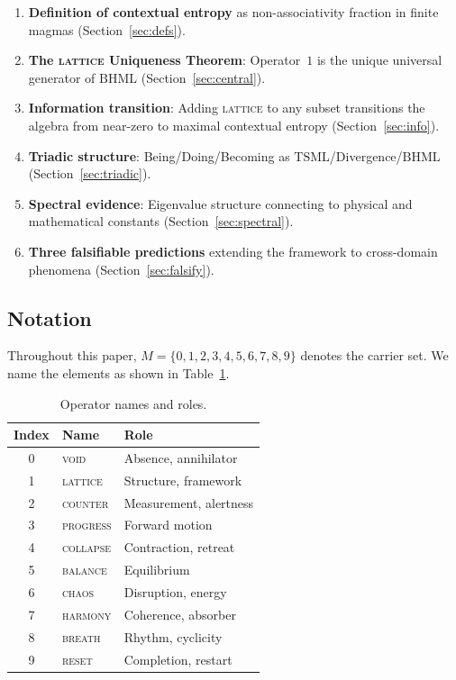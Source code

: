 \documentclass[11pt,a4paper]{article}
\theoremstyle{definition}
\theoremstyle{remark}
\newcommand{\TSML}{\mathrm{TSML}}
\newcommand{\BHML}{\mathrm{BHML}}
\begin{document}
\begin{enumerate}[label=(\arabic*)]
\item \textbf{Definition of contextual entropy} as non-associativity fraction in finite magmas (Section~\ref{sec:defs}).
\item \textbf{The \textsc{lattice} Uniqueness Theorem}: Operator~$1$ is the unique universal generator of $\BHML$ (Section~\ref{sec:central}).
\item \textbf{Information transition}: Adding \textsc{lattice} to any subset transitions the algebra from near-zero to maximal contextual entropy (Section~\ref{sec:info}).
\item \textbf{Triadic structure}: Being/Doing/Becoming as $\TSML$/Divergence/$\BHML$ (Section~\ref{sec:triadic}).
\item \textbf{Spectral evidence}: Eigenvalue structure connecting to physical and mathematical constants (Section~\ref{sec:spectral}).
\item \textbf{Three falsifiable predictions} extending the framework to cross-domain phenomena (Section~\ref{sec:falsify}).
\end{enumerate}

\subsection{Notation}\label{sec:notation}

Throughout this paper, $M = \{0,1,2,3,4,5,6,7,8,9\}$ denotes the carrier set. We name the elements as shown in Table~\ref{tab:operators}.

\begin{table}[ht]
\centering
\caption{Operator names and roles.}\label{tab:operators}
\begin{tabular}{cll}
\toprule
Index & Name & Role \\
\midrule
0 & \textsc{void}     & Absence, annihilator \\
1 & \textsc{lattice}  & Structure, framework \\
2 & \textsc{counter}  & Measurement, alertness \\
3 & \textsc{progress} & Forward motion \\
4 & \textsc{collapse} & Contraction, retreat \\
5 & \textsc{balance}  & Equilibrium \\
6 & \textsc{chaos}    & Disruption, energy \\
7 & \textsc{harmony}  & Coherence, absorber \\
8 & \textsc{breath}   & Rhythm, cyclicity \\
9 & \textsc{reset}    & Completion, restart \\
\bottomrule
\end{tabular}
\end{table}
\end{document}

